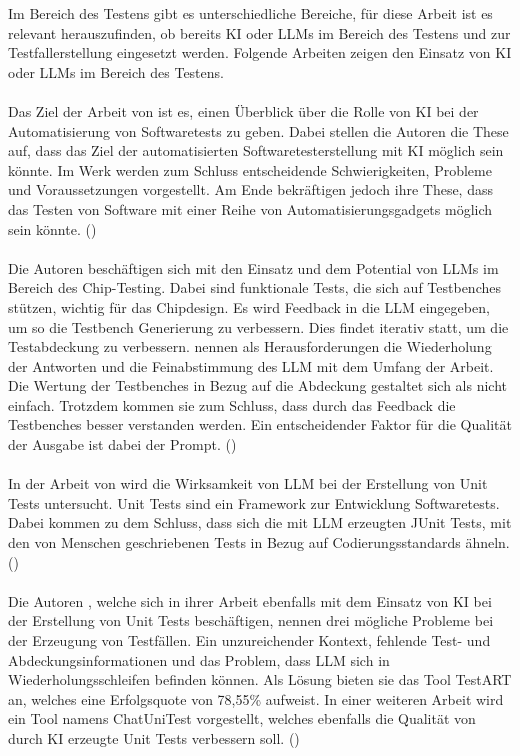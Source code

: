 \documentclass[12pt,toc=bib,toc=listof]{scrreprt}
\begin{document}
\noindent Im Bereich des Testens gibt es unterschiedliche Bereiche, für diese Arbeit ist es relevant herauszufinden, ob bereits KI oder LLMs im Bereich des Testens und zur Testfallerstellung eingesetzt werden. Folgende Arbeiten zeigen den Einsatz von KI oder LLMs im Bereich des Testens. \\
\\
Das Ziel der Arbeit von \textcite{Khan2024} ist es, einen Überblick über die Rolle von KI bei der Automatisierung von Softwaretests zu geben. Dabei stellen die Autoren \textcite{Khan2024} die These auf, dass das Ziel der automatisierten Softwaretesterstellung mit KI möglich sein könnte. Im Werk werden zum Schluss entscheidende Schwierigkeiten, Probleme und Voraussetzungen vorgestellt. Am Ende bekräftigen \textcite{Khan2024} jedoch ihre These, dass das Testen von Software mit einer Reihe von Automatisierungsgadgets möglich sein könnte. (\cite{Khan2024})\\
\\
Die Autoren \textcite{Bhandari2024} beschäftigen sich mit den Einsatz und dem Potential von LLMs im Bereich des Chip-Testing. Dabei sind funktionale Tests, die sich auf Testbenches stützen, wichtig für das Chipdesign. Es wird Feedback in die LLM eingegeben, um so die Testbench Generierung zu verbessern. Dies findet iterativ statt, um die Testabdeckung zu verbessern. \textcite{Bhandari2024} nennen als Herausforderungen die Wiederholung der Antworten und die Feinabstimmung des LLM mit dem Umfang der Arbeit. Die Wertung der Testbenches in Bezug auf die Abdeckung gestaltet sich als nicht einfach. Trotzdem kommen sie zum Schluss, dass durch das Feedback die Testbenches besser verstanden werden. Ein entscheidender Faktor für die Qualität der Ausgabe ist dabei der Prompt. (\cite{Bhandari2024})\\
\\
In der Arbeit von \textcite{Ouédraogo2024} wird die Wirksamkeit von LLM bei der Erstellung von Unit Tests untersucht. Unit Tests sind ein Framework zur Entwicklung Softwaretests. Dabei kommen \textcite{Ouédraogo2024} zu dem Schluss, dass sich die mit LLM erzeugten JUnit Tests, mit den von Menschen geschriebenen Tests in Bezug auf Codierungsstandards ähneln. (\cite{Ouédraogo2024})\\
\\
Die Autoren \textcite{Gu2024}, welche sich in ihrer Arbeit ebenfalls mit dem Einsatz von KI bei der Erstellung von Unit Tests beschäftigen, nennen drei mögliche Probleme bei der Erzeugung von Testfällen.
Ein unzureichender Kontext, fehlende Test- und Abdeckungsinformationen und das Problem, dass LLM sich in Wiederholungsschleifen befinden können. Als Lösung bieten sie das Tool TestART an, welches eine Erfolgsquote von 78,55\% aufweist. In einer weiteren Arbeit wird ein Tool namens ChatUniTest vorgestellt, welches ebenfalls die Qualität von durch KI erzeugte Unit Tests verbessern soll. (\cite{Gu2024})\\
\end{document}
